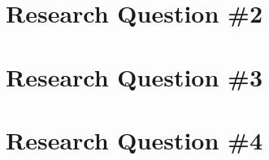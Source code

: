\begin{multicols}{2}
    \section{Research Question \#2}
    \section{Research Question \#3}
    \section{Research Question \#4}
\end{multicols}